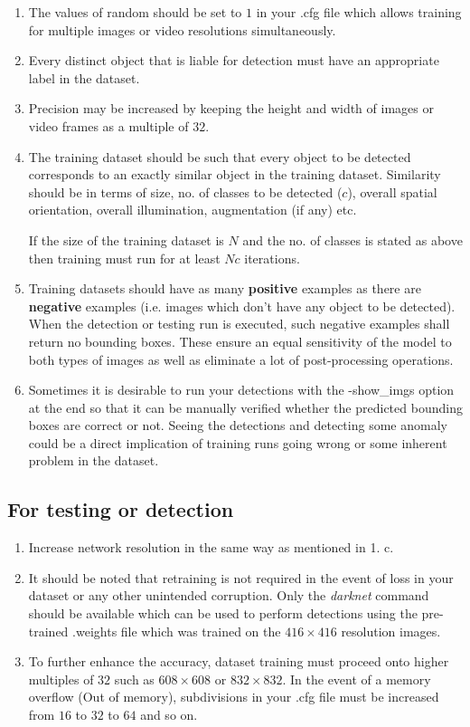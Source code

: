 \begin{enumerate}
  \item The values of {\selectfont random} should be set to $1$ in your  {\selectfont .cfg} file which allows training for multiple images or video resolutions simultaneously.
  \item Every distinct object that is liable for detection must have an appropriate label in the dataset.
  \item Precision may be increased by keeping the height and width of images or video frames as a multiple of $32$.
  \item The training dataset should be such that every object to be detected corresponds to an exactly similar object in the training dataset. Similarity should be in terms of size, no. of classes to be detected ($c$), overall spatial orientation, overall illumination, augmentation (if any) etc. \par

  If the size of the training dataset is $N$ and the no. of classes is stated as above then training must run for at least $Nc$ iterations.
  \item Training datasets should have as many \textbf{positive} examples as there are \textbf{negative} examples (i.e. images which don’t have any object to be detected). When the detection or testing run is executed, such negative examples shall return no bounding boxes. These ensure an equal sensitivity of the model to both types of images as well as eliminate a lot of post-processing operations.
  \item Sometimes it is desirable to run your detections with the {\selectfont -show\_imgs} option at the end so that it can be manually verified whether the predicted bounding boxes are correct or not. Seeing the detections and detecting some anomaly could be a direct implication of training runs going wrong or some inherent problem in the dataset.
\end{enumerate}


\subsection{For testing or detection}

\begin{enumerate}
  \item Increase network resolution in the same way as mentioned in 1. c.
  \item It should be noted that retraining is not required in the event of loss in your dataset or any other unintended corruption. Only the \textit{darknet} command should be available which can be used to perform detections using the pre-trained {\selectfont .weights} file which was trained on the $416 \times 416$ resolution images.
  \item To further enhance the accuracy, dataset training must proceed onto higher multiples of  $32$ such as $608 \times 608$ or $832 \times 832$. In the event of a memory overflow ({\selectfont Out of memory}), {\selectfont subdivisions} in your {\selectfont .cfg} file must be increased from $16$ to $32$ to $64$ and so on.
\end{enumerate}
